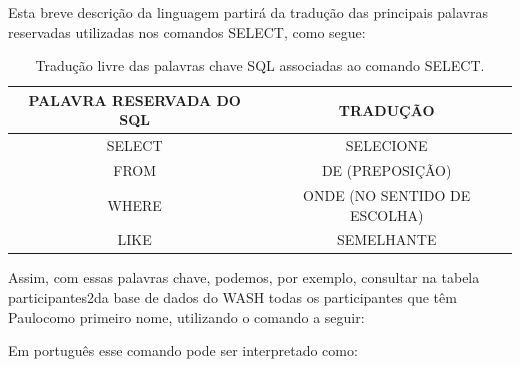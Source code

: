 \documentclass[
12pt,		%
openright,	%
twoside,  %
a4paper,			%
chapter=TITLE,		%
english,			%
french,				%
spanish,			%
brazil				%
]{USPSC-classe/USPSC}
\begin{document}
Esta breve descri\c{c}\~ao da linguagem partir\'a da tradu\c{c}\~ao das principais palavras reservadas utilizadas nos comandos SELECT, como segue:








\begin{table}[htb]
\tiny
\caption{\label{4b66144149fcef1c5bff55ce7a2ed8760dc3fe3a}Tradu\c{c}\~ao livre das palavras chave SQL associadas ao comando SELECT.}

\centering
\begin{tabular}{|c|c|}
\hline
PALAVRA RESERVADA DO SQL  &  TRADU\c{C}\~AO \\
\hline
SELECT  &  SELECIONE \\
FROM  &  DE (PREPOSI\c{C}\~AO) \\
WHERE  &  ONDE (NO SENTIDO DE ESCOLHA) \\
LIKE  &  SEMELHANTE \\
\hline
\end{tabular}
\end{table}


Assim, com essas palavras chave, podemos, por exemplo, consultar na tabela \textquotedbl participantes2\textquotedbl  da base de dados do WASH todas os participantes que t\^em \textquotedbl Paulo\textquotedbl  como primeiro nome, utilizando o comando a seguir:





\noindent\begin{center}\mbox{\centering{}}\end{center}


Em portugu\^es esse comando pode ser interpretado como:





\noindent\begin{center}\mbox{\centering{}}\end{center}
\end{document}
